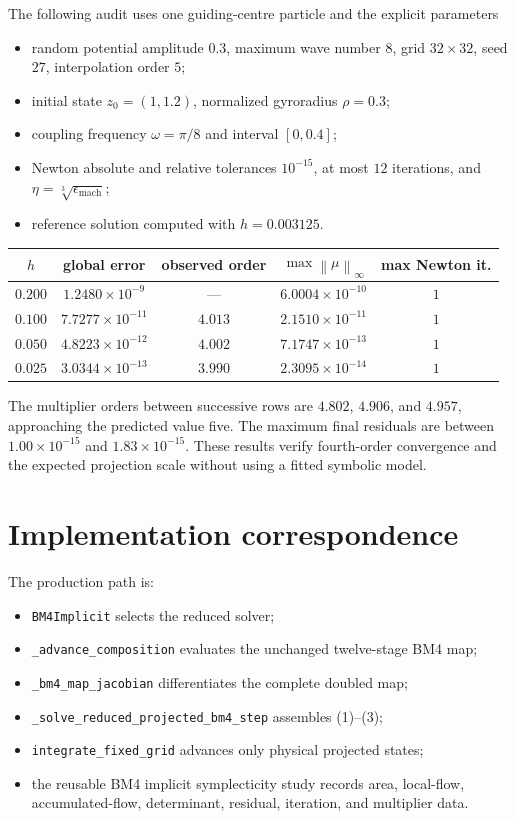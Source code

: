 \documentclass[11pt,a4paper]{article}
\newcommand{\norm}[1]{\left\lVert #1\right\rVert}
\begin{document}
The following audit uses one guiding-centre particle and the explicit parameters
\begin{itemize}
 \item random potential amplitude $0.3$, maximum wave number $8$, grid
       $32\times32$, seed $27$, interpolation order $5$;
 \item initial state $z_0=(1,1.2)$, normalized gyroradius $\rho=0.3$;
 \item coupling frequency $\omega=\pi/8$ and interval $[0,0.4]$;
 \item Newton absolute and relative tolerances $10^{-15}$, at most $12$
       iterations, and $\eta=\sqrt[3]{\epsilon_{\mathrm{mach}}}$;
 \item reference solution computed with $h=0.003125$.
\end{itemize}

\begin{center}
\small
\begin{tabular}{@{}ccccc@{}}
\toprule
$h$ & global error & observed order & $\max\norm{\mu}_\infty$ & max Newton it.\\
\midrule
$0.200$ & $1.2480\times10^{-9}$  & ---    & $6.0004\times10^{-10}$ & $1$\\
$0.100$ & $7.7277\times10^{-11}$ & $4.013$& $2.1510\times10^{-11}$ & $1$\\
$0.050$ & $4.8223\times10^{-12}$ & $4.002$& $7.1747\times10^{-13}$ & $1$\\
$0.025$ & $3.0344\times10^{-13}$ & $3.990$& $2.3095\times10^{-14}$ & $1$\\
\bottomrule
\end{tabular}
\end{center}

The multiplier orders between successive rows are $4.802$, $4.906$, and
$4.957$, approaching the predicted value five.  The maximum final residuals are
between $1.00\times10^{-15}$ and $1.83\times10^{-15}$.  These results verify
fourth-order convergence and the expected projection scale without using a
fitted symbolic model.

\section{Implementation correspondence}

The production path is:
\begin{itemize}
 \item \texttt{BM4Implicit} selects the reduced solver;
 \item \texttt{\_advance\_composition} evaluates the unchanged twelve-stage BM4 map;
 \item \texttt{\_bm4\_map\_jacobian} differentiates the complete doubled map;
 \item \texttt{\_solve\_reduced\_projected\_bm4\_step} assembles (1)--(3);
 \item \texttt{integrate\_fixed\_grid} advances only physical projected states;
 \item the reusable BM4 implicit symplecticity study records area, local-flow,
       accumulated-flow, determinant, residual, iteration, and multiplier data.
\end{itemize}
\end{document}
